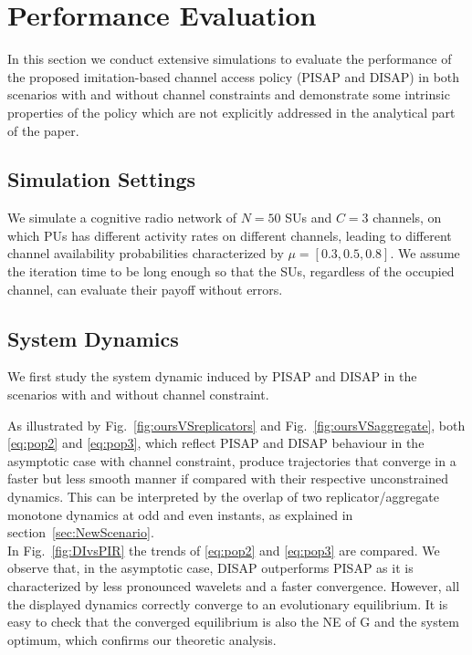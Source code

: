 \documentclass[12pt, onecolumn]{IEEEtran}
\theoremstyle{plain}
\theoremstyle{definition}
\begin{document}
 \section{Performance Evaluation}
 \label{sec:simu}
 In this section we conduct extensive simulations to evaluate the performance of the proposed imitation-based channel access policy (PISAP and DISAP) in both scenarios with and without channel constraints and demonstrate some intrinsic properties of the policy which are not explicitly addressed in the analytical part of the paper.

 \subsection{Simulation Settings}

 We simulate a cognitive radio network of $N=50$ SUs and $C=3$ channels, on which PUs has different activity rates on different channels, leading to different channel availability
probabilities characterized by $\mu=[0.3, 0.5, 0.8]$. We assume the iteration time to be long enough so that the SUs, regardless of the occupied channel, can evaluate their payoff
without errors.





 \subsection{System Dynamics}

We first study the system dynamic induced by PISAP and DISAP in the scenarios with and without channel constraint.

As illustrated by Fig.~\ref{fig:oursVSreplicators} and Fig.~\ref{fig:oursVSaggregate},
both \eqref{eq:pop2} and \eqref{eq:pop3}, which reflect PISAP and DISAP behaviour in the asymptotic case with channel constraint, produce trajectories that converge in a faster but less smooth manner if compared with
their respective unconstrained dynamics. This can be interpreted by the overlap of two replicator/aggregate monotone dynamics at odd and even instants, as
explained in section~\ref{sec:NewScenario}.\\
In Fig.~\ref{fig:DIvsPIR} the trends of \eqref{eq:pop2} and \eqref{eq:pop3} are compared. We observe that, in the asymptotic case, DISAP outperforms PISAP as it is characterized by less
pronounced wavelets and a faster convergence. However, all the displayed dynamics correctly converge
to an evolutionary equilibrium. It is easy to check that the converged equilibrium is also the NE of G and the system optimum, which confirms our theoretic analysis.
\end{document}
